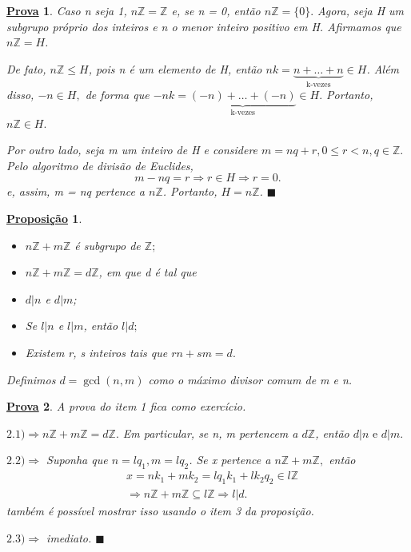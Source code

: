 \documentclass{article}
\newtheorem*{prop*}{\underline{Proposi\c c\~ao}}
\newtheorem*{proof*}{\underline{Prova}}
\renewcommand\qedsymbol{$\blacksquare$}
\begin{document}
\begin{proof*}
  Caso n seja 1, $n \mathbb{Z} = \mathbb{Z}$ e, se n = 0, ent\~ao $n \mathbb{Z} = \{0\}. $ Agora, seja H um subgrupo pr\'oprio dos
inteiros e n o menor inteiro positivo em H. Afirmamos que $n \mathbb{Z} = H$. 

  De fato, $n \mathbb{Z} \leq{H}$, pois n \'e um elemento de H, ent\~ao $nk = \underbrace{n + \ldots + n}_{\text{k-vezes}} \in H$. Al\'em disso, $-n\in H,$ de forma
que $-nk = \underbrace{(-n) + \ldots + (-n)}_{\text{k-vezes}}\in H.$ Portanto, $n \mathbb{Z}\in H.$

  Por outro lado, seja m um inteiro de H e considere $m = nq + r, 0 \leq{r} < n, q\in \mathbb{Z}.$ Pelo algoritmo de divis\~ao de Euclides,
  $$
  m - nq = r \Rightarrow r\in H\Rightarrow r = 0.
  $$
  e, assim, m = nq pertence a $n\mathbb{Z}$. Portanto, $H = n \mathbb{Z}$. \qedsymbol
\end{proof*}
\begin{prop*}
 \begin{itemize}
   \item[1)] $n \mathbb{Z} + m \mathbb{Z}$ \'e subgrupo de $\mathbb{Z};$
   \item[2)] $n \mathbb{Z} + m \mathbb{Z} = d \mathbb{Z}$, em que d \'e tal que 
    \item[2.1)] $d | n$ e $d | m$;
      \item[2.2)] Se $l | n$ e $l | m$, ent\~ao $l | d;$
        \item[2.3)] Existem r, s inteiros tais que $rn + sm = d.$
 \end{itemize}
 Definimos $d = \gcd{(n, m)}$ como o m\'aximo divisor comum de m e n.
\end{prop*}
\begin{proof*}
  A prova do item 1 fica como exerc\'icio. 

  $2.1)\Rightarrow n \mathbb{Z} + m \mathbb{Z} = d \mathbb{Z}.$ Em particular, se n, m pertencem a $d \mathbb{Z}$, ent\~ao
$d | n \text{ e } d | m.$

  $2.2)\Rightarrow$ Suponha que $n = lq_{1}, m = lq_{2} $. Se x pertence a $n \mathbb{Z} + m \mathbb{Z},$ ent\~ao
  \begin{align*}
    &x = nk_{1} + mk_{2} = lq_{1}k_{1} + lk_{2}q_{2} \in l \mathbb{Z} \\
    &\Rightarrow n \mathbb{Z} + m \mathbb{Z} \subseteq{l \mathbb{Z}} \Rightarrow l | d.
  \end{align*}
  tamb\'em \'e poss\'ivel mostrar isso usando o item 3 da proposi\c c\~ao.

  $2.3)\Rightarrow$ imediato. \qedsymbol
\end{proof*}
\end{document}
